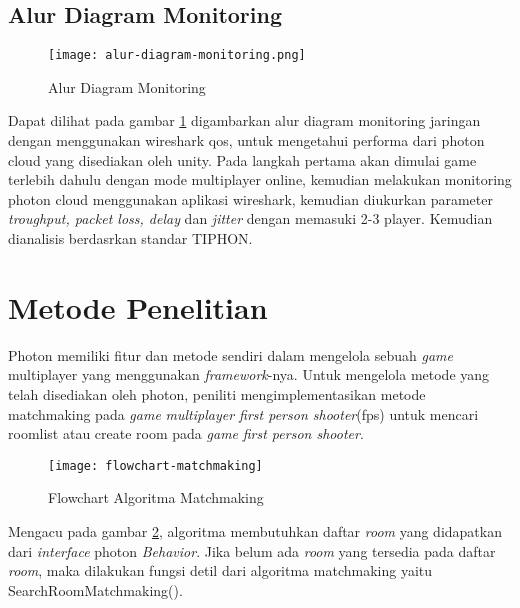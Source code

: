 \subsection{Alur Diagram Monitoring}
\begin{figure}[h]
    \centering
    \texttt{[image: alur-diagram-monitoring.png]}
    \caption{Alur Diagram Monitoring}
    \label{fig:alur-diagram}
\end{figure}

Dapat dilihat pada gambar \ref{fig:alur-diagram} digambarkan alur diagram monitoring jaringan dengan menggunakan wireshark qos, untuk mengetahui performa dari photon cloud yang disediakan oleh unity.
Pada langkah pertama akan dimulai game terlebih dahulu dengan mode multiplayer online, kemudian melakukan monitoring photon cloud menggunakan aplikasi wireshark, kemudian diukurkan parameter \textit{troughput, packet loss, delay} dan \textit{jitter} dengan memasuki 2-3 player.
Kemudian dianalisis berdasrkan standar TIPHON.
\newpage
\section{Metode Penelitian}
\noindent

Photon memiliki fitur dan metode sendiri dalam mengelola sebuah \textit{game} multiplayer yang menggunakan \textit{framework}-nya. Untuk mengelola metode yang telah disediakan oleh photon, peniliti mengimplementasikan metode matchmaking pada \textit{game} \textit{multiplayer first person shooter}(fps) untuk mencari roomlist atau create room pada \textit{game} \textit{first person shooter}.
        \begin{figure}[h]
         \centering
         \texttt{[image: flowchart-matchmaking]}
         \caption{Flowchart Algoritma Matchmaking}
         \label{fig:algoritmamatmaching}
         \end{figure}

Mengacu pada gambar \ref{fig:algoritmamatmaching}, algoritma membutuhkan daftar \textit{room} yang didapatkan dari \textit{interface} photon \textit{Behavior}. Jika belum ada \textit{room} yang tersedia pada daftar \textit{room}, maka dilakukan fungsi detil dari algoritma matchmaking yaitu SearchRoomMatchmaking(). 

    

